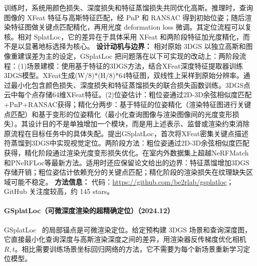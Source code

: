 训练时，系统用颜色损失、深度损失和特征蒸馏损失共同优化高斯。推理时，查询图像的 XFeat 特征与高斯特征匹配，经 PnP 和 RANSAC 得到初始位姿；随后渲染特征图做关键点匹配精化，再用光度 deformation loss 微调。其定位流程可以复核。相对 SplatLoc，它的差异在于具体采用 XFeat 和两阶段特征加光度精化，而不是以显著地标选择为核心。
\textbf{设计动机与边界：} 相对原始 3DGS 以独立高斯和图像重建误差为主的设定，GSplatLoc 把问题落在以下可实现的改动上：两阶段流程：(1)场景建模：使用基于特征的3DGS方法，结合XFeat深度特征提取器训练3DGS模型。XFeat生成(W/8)*(H/8)*64特征图，双线性上采样到原始分辨率。通过最小化包含颜色损失、深度损失和特征蒸馏损失的联合损失函数训练。3DGS点云中每个点存储64维XFeat特征。(2)位姿估计：粗位姿通过2D-3D余弦相似度匹配+PnP+RANSAC获得；精化分两步：基于特征的位姿精化（渲染特征图进行关键点匹配）和基于变形的位姿精化（最小化查询图像与渲染图像间的光度变形损失）。其设计目的不是单独增加一个模块，而是用上述表示、监督或渲染约束消除原流程在目标任务中的具体失配。提出GSplatLoc，首次将XFeat密集关键点描述符蒸馏到3DGS中实现视觉定位。两阶段方法：粗位姿通过2D-3D余弦相似度匹配获得，精化阶段通过渲染光度变形损失优化。在室内外数据集上超越NeRFMatch和PNeRFLoc等最新方法。适用时还应保留论文给出的边界：特征蒸馏增加3DGS存储开销；粗位姿估计依赖充分的关键点匹配；精化阶段的渲染损失在纹理缺失区域可能不稳定。
\textbf{方法信息：} 代码：\url{https://github.com/be2rlab/gsplatloc}；GitHub 关注度较高，约 145 stars。



\paragraph{GSplatLoc（可微深度渲染的超精确定位）（2024.12）}
GSplatLoc~\cite{2412_20056} 的局部锚点是可微渲染定位。给定预构建 3DGS 场景和查询深度图，它直接最小化查询深度与高斯渲染深度之间的差异，用渲染器反传梯度优化相机 $R,t$。相比需要训练场景坐标回归网络的方法，它不需要为每个新场景重新学习定位模型。

